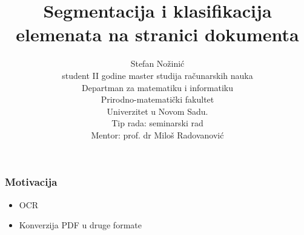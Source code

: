 \documentclass{beamer}
\begin{document}
\title{Segmentacija i klasifikacija elemenata na stranici dokumenta}
\author{Stefan Nožinić \\
student II godine master studija računarskih nauka \\
Departman za matematiku i informatiku \\
Prirodno-matematički fakultet \\
Univerzitet u Novom Sadu. \\
Tip rada: seminarski rad \\
Mentor: \MakeLowercase{prof. dr} Miloš Radovanović
}

\frame{
\titlepage
}




\begin{frame}
	\frametitle{Motivacija}
	\begin{itemize}
		\item OCR
		\item Konverzija PDF u druge formate 
	\end{itemize}

\end{frame}
\end{document}
